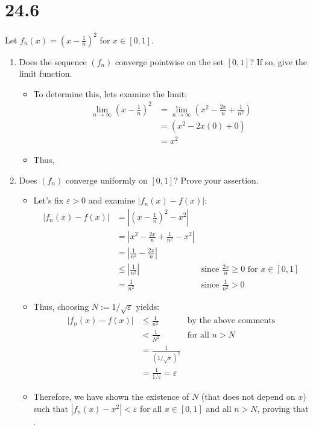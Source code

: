 \documentclass[10pt,a4paper]{article}
\theoremstyle{definition}
\begin{document}
\section*{24.6}
Let $\displaystyle f_n(x) = \left(x - \frac{1}{n}\right)^2$ for $x \in [0,1]$.
\begin{enumerate}[label = (\alph*)]
\item Does the sequence $(f_n)$ converge pointwise on the set $[0,1]$? If so, give the limit function.
	\begin{itemize}
	\item To determine this, lets examine the limit:
	\begin{align*}
	\lim_{n \to \infty} \left(x - \frac{1}{n}\right)^2 &= \lim_{n \to \infty} \left(x^2 - \frac{2x}{n} + \frac{1}{n^2}\right)\\
	&= \left(x^2 - 2x(0) + 0\right)\\
	&= x^2
	\end{align*}
	\item Thus, 
	\end{itemize}
\item Does $(f_n)$ converge uniformly on $[0,1]$? Prove your assertion.
	\begin{itemize}
	\item Let's fix $\varepsilon > 0$ and examine $|f_n(x) - f(x)|$:
	\begin{align*}
	|f_n(x) - f(x)| &= \left|\left(x - \frac{1}{n}\right)^2 - x^2\right|\\
	&= \left|x^2 - \frac{2x}{n} + \frac{1}{n^2} - x^2\right|\\
	&= \left|\frac{1}{n^2} - \frac{2x}{n}\right|\\
	&\leq \left|\frac{1}{n^2}\right| &\text{since $\frac{2x}{n} \geq 0$ for $x \in [0,1]$}\\
	&= \frac{1}{n^2} &\text{since $\frac{1}{n^2} > 0$}
	\end{align*}
	\item Thus, choosing $N := 1/\sqrt{\varepsilon}$ yields:
	\begin{align*}
	|f_n(x) - f(x)| &\leq \frac{1}{n^2} &\text{by the above comments}\\
	&< \frac{1}{N^2} &\text{for all $n > N$}\\
	&= \frac{1}{(1/\sqrt{\varepsilon})^2}\\
	&= \frac{1}{1/\varepsilon} = \varepsilon
	\end{align*}
	\item Therefore, we have shown the existence of $N$ (that does not depend on $x$) such that $|f_n(x) - x^2| < \varepsilon$ for all $x \in [0,1]$ and all $n > N$, proving that .
	\end{itemize}
\end{enumerate}
\end{document}
